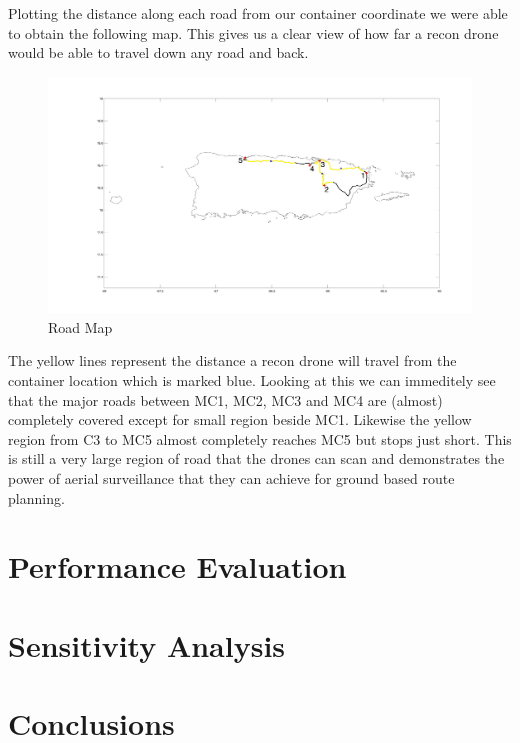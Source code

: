 \documentclass[a4paper,12pt]{article}
\begin{document}
\begin{itemize}
Plotting the distance along each road from our container coordinate we were able to obtain the following map. This gives us a clear view of how far
a recon drone would be able to travel down any road and back.

\begin{figure}[h]
\centering
\includegraphics[scale =0.18]{NewRoadNoCircles}
\caption{Road Map}
\label{road-approx}
\end{figure}

The yellow lines represent the distance a recon drone will travel from the container location which is marked blue. Looking at this we can immeditely see that the major roads
between MC1, MC2, MC3 and MC4 are (almost) completely covered except for small region beside MC1.
Likewise the yellow region from C3 to MC5 almost completely reaches MC5 but stops just short. This is still a very large region of road that the drones can scan
and demonstrates the power of aerial surveillance that they can achieve for ground based route planning.


\newpage

\section{Performance Evaluation}

\newpage

\section{Sensitivity Analysis}

\newpage

\section{Conclusions}


\end{itemize}
\end{document}
